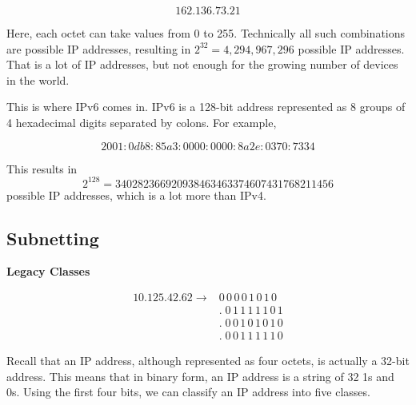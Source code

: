 \[
162.136.73.21
\]

Here, each octet can take values from 0 to 255.
Technically all such combinations are possible
IP addresses, resulting in
$2^{32} = 4,294,967,296$ possible IP addresses.
That is a lot of IP addresses, but not enough
for the growing number of devices in the world.

This is where IPv6 comes in. IPv6 is a 128-bit
address represented as 8 groups of 4 hexadecimal
digits separated by colons. For example,

\[
2001:0db8:85a3:0000:0000:8a2e:0370:7334
\]


This results in
\[
  2^{128} = 340282366920938463463374607431768211456
\]
possible IP addresses, which is a lot more than
IPv4.

\subsection{Subnetting}

\textbf{Legacy Classes}

\[
\begin{aligned}
10.125.42.62 \rightarrow {}&
0\,0\,0\,0\,1\,0\,1\,0 \\
&.\;0\,1\,1\,1\,1\,1\,0\,1 \\
&.\;0\,0\,1\,0\,1\,0\,1\,0 \\
&.\;0\,0\,1\,1\,1\,1\,1\,0
\end{aligned}
\]

Recall that an IP address, although represented as
four octets, is actually a 32-bit address. This
means that in binary form, an IP address is a
string of 32 1s and 0s. Using the first four bits,
we can classify an IP address into five classes.

